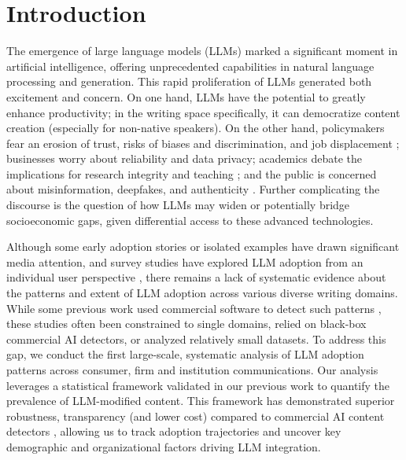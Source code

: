 


\section*{Introduction}
\label{sec:introduction}


The  emergence of large language models (LLMs) marked a significant moment in artificial intelligence, offering unprecedented capabilities in natural language processing and generation.  
This rapid proliferation of LLMs generated both excitement and concern. On one hand, LLMs have the potential to greatly enhance productivity; in the writing space specifically, it can democratize content creation (especially for non-native speakers). On the other hand, policymakers fear an erosion of trust, risks of biases and discrimination, and job displacement \cite{whitehouse2022ai,bommasani2021opportunities,StanfordAIIndex2024}; businesses worry about reliability and data privacy; academics debate the implications for research integrity and teaching \cite{Dwivedi2023,Kasneci2023}; and the public is concerned about misinformation, deepfakes, and authenticity \cite{bender2021,weidinger2021ethical}. Further complicating the discourse is the question of how LLMs may widen or potentially bridge socioeconomic gaps, given differential access to these advanced technologies.

Although some early adoption stories or isolated examples have drawn significant media attention, and survey studies have explored LLM adoption from an individual user perspective \cite{humlum2024chatgpt, bick2024rapid}, there remains a lack of systematic evidence about the patterns and extent of LLM adoption across various diverse writing domains. While some previous work used commercial software to detect such patterns \cite{brooks2024riseaigeneratedcontentwikipedia, shin2024adoption},  these studies often been constrained to single domains, relied on black-box commercial AI detectors, or analyzed relatively small datasets.
To address this gap, we conduct the first large-scale, systematic analysis of LLM adoption patterns across consumer, firm and institution communications. 
Our analysis leverages a statistical framework validated in our previous work \cite{liang2024monitoring} 
to quantify the prevalence of LLM-modified content. This framework has demonstrated superior robustness, transparency (and lower cost) compared to commercial AI content detectors \cite{liang2024monitoring, liang2024mapping, Liang2023GPTDA}, allowing us to track adoption trajectories and uncover key demographic and organizational factors driving LLM integration. 

